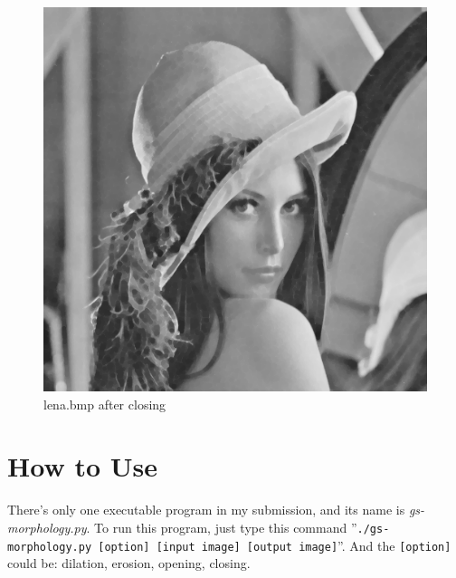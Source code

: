 \documentclass[14pt,a4paper]{extarticle}
\begin{document}
\begin{figure}[H]
\centering
\includegraphics[scale=0.6]{lena-closing.bmp}
\caption{lena.bmp after closing}
\label{fig:lena-closing.bmp}
\end{figure}

\section{How to Use}

There's only one executable program in my submission, and its name is \textit{gs-morphology.py}. To run this program, just type this command ''\texttt{./gs-morphology.py [option] [input image] [output image]}''. And the \texttt{[option]} could be: dilation, erosion, opening, closing.
\end{document}

